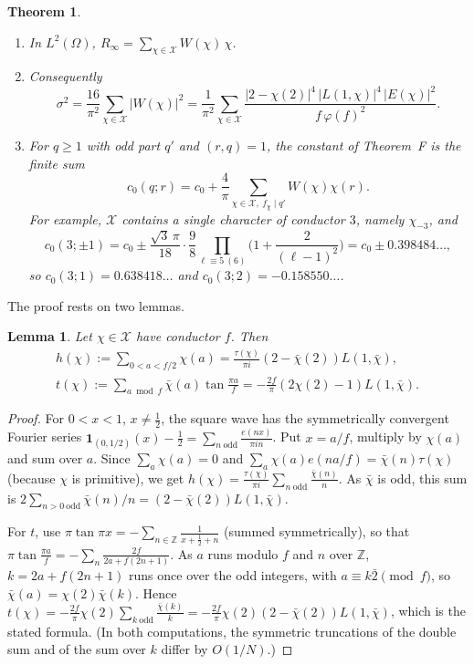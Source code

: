 \documentclass[11pt]{amsart}
\newtheorem{theorem}{Theorem}
\newtheorem{lemma}{Lemma}[section]
\theoremstyle{remark}
\newcommand{\Z}{\mathbb{Z}}
\begin{document}
\begin{theorem}\label{thm:J}
\begin{enumerate}
\item[(a)] In $L^2(\Omega)$, $R_\infty=\sum_{\chi\in\mathcal X}W(\chi)\,\chi$.
\item[(b)] Consequently
\[
\sigma^2=\frac{16}{\pi^2}\sum_{\chi\in\mathcal X}|W(\chi)|^2=\frac1{\pi^2}\sum_{\chi\in\mathcal X}\frac{|2-\chi(2)|^4\,|L(1,\chi)|^4\,|E(\chi)|^2}{f\,\varphi(f)^2}.
\]
\item[(c)] For $q\ge1$ with odd part $q'$ and $(r,q)=1$, the constant of Theorem~F is the finite sum
\[
c_0(q;r)=c_0+\frac4\pi\sum_{\chi\in\mathcal X,\ f_\chi\mid q'}W(\chi)\chi(r).
\]
For example, $\mathcal X$ contains a single character of conductor $3$, namely $\chi_{-3}$, and
\[
c_0(3;\pm1)=c_0\pm\frac{\sqrt3\,\pi}{18}\cdot\frac98\prod_{\ell\equiv5\ (6)}\Big(1+\frac2{(\ell-1)^2}\Big)=c_0\pm0.398484\ldots,
\]
so $c_0(3;1)=0.638418\ldots$ and $c_0(3;2)=-0.158550\ldots$.
\end{enumerate}
\end{theorem}

The proof rests on two lemmas.

\begin{lemma}\label{lem:hT}
Let $\chi\in\mathcal X$ have conductor $f$. Then
\begin{gather*}
h(\chi):=\sum_{0<a<f/2}\chi(a)=\frac{\tau(\chi)}{\pi i}(2-\bar\chi(2))L(1,\bar\chi),\\
t(\chi):=\sum_{a\bmod f}\bar\chi(a)\tan\frac{\pi a}f=-\frac{2f}\pi(2\chi(2)-1)L(1,\bar\chi).
\end{gather*}
\end{lemma}

\begin{proof}
For $0<x<1$, $x\ne\frac12$, the square wave has the symmetrically convergent Fourier series $\mathbf 1_{(0,1/2)}(x)-\frac12=\sum_{n\ \mathrm{odd}}\frac{e(nx)}{\pi in}$. Put $x=a/f$, multiply by $\chi(a)$ and sum over $a$. Since $\sum_a\chi(a)=0$ and $\sum_a\chi(a)e(na/f)=\bar\chi(n)\tau(\chi)$ (because $\chi$ is primitive), we get $h(\chi)=\frac{\tau(\chi)}{\pi i}\sum_{n\ \mathrm{odd}}\frac{\bar\chi(n)}n$. As $\bar\chi$ is odd, this sum is $2\sum_{n>0\ \mathrm{odd}}\bar\chi(n)/n=(2-\bar\chi(2))L(1,\bar\chi)$.

For $t$, use $\pi\tan\pi x=-\sum_{n\in\Z}\frac1{x+\frac12+n}$ (summed symmetrically), so that $\pi\tan\frac{\pi a}f=-\sum_n\frac{2f}{2a+f(2n+1)}$. As $a$ runs modulo $f$ and $n$ over $\Z$, $k=2a+f(2n+1)$ runs once over the odd integers, with $a\equiv k\bar2\pmod f$, so $\bar\chi(a)=\chi(2)\bar\chi(k)$. Hence $t(\chi)=-\frac{2f}\pi\chi(2)\sum_{k\ \mathrm{odd}}\frac{\bar\chi(k)}k=-\frac{2f}\pi\chi(2)(2-\bar\chi(2))L(1,\bar\chi)$, which is the stated formula. (In both computations, the symmetric truncations of the double sum and of the sum over $k$ differ by $O(1/N)$.)
\end{proof}
\end{document}
